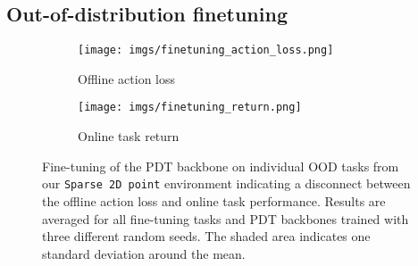 \documentclass{article} %
\begin{document}
\subsection{Out-of-distribution finetuning}\label{app:ood-training}
\begin{figure*}[h!]
    \centering
    \begin{subfigure}{0.45\textwidth}
        \texttt{[image: imgs/finetuning\_action\_loss.png]}
        \caption{Offline action loss}
        \label{fig:2d-finetune-loss}
    \end{subfigure}
    \hfill
    \begin{subfigure}{0.45\textwidth}
        \texttt{[image: imgs/finetuning\_return.png]}
        \caption{Online task return}
        \label{fig:2d-finetune-return}
    \end{subfigure}
    \caption{Fine-tuning of the PDT backbone on individual OOD tasks from our \texttt{Sparse 2D point} environment indicating a disconnect between the offline action loss and online task performance. Results are averaged for all fine-tuning tasks and PDT backbones trained with three different random seeds. The shaded area indicates one standard deviation around the mean.}
    \label{fig:finetune-training}
\end{figure*}
\end{document}
